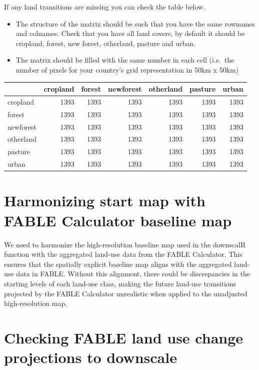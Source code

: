 \documentclass[
]{article}
\begin{document}
If any land transitions are missing you can check the table below.

\begin{itemize}
\item
  The structure of the matrix should be such that you have the same
  rownames and colnames. Check that you have all land covers, by default
  it should be cropland, forest, new forest, otherland, pasture and
  urban.
\item
  The matrix should be filled with the same number in each cell
  (i.e.~the number of pixels for your country's grid representation in
  50km x 50km)
\end{itemize}

\begin{longtable}[]{@{}lrrrrrr@{}}
\toprule\noalign{}
& cropland & forest & newforest & otherland & pasture & urban \\
\midrule\noalign{}
\endhead
\bottomrule\noalign{}
\endlastfoot
cropland & 1393 & 1393 & 1393 & 1393 & 1393 & 1393 \\
forest & 1393 & 1393 & 1393 & 1393 & 1393 & 1393 \\
newforest & 1393 & 1393 & 1393 & 1393 & 1393 & 1393 \\
otherland & 1393 & 1393 & 1393 & 1393 & 1393 & 1393 \\
pasture & 1393 & 1393 & 1393 & 1393 & 1393 & 1393 \\
urban & 1393 & 1393 & 1393 & 1393 & 1393 & 1393 \\
\end{longtable}

\section{Harmonizing start map with FABLE Calculator baseline
map}\label{harmonizing-start-map-with-fable-calculator-baseline-map}

We need to harmonize the high-resolution baseline map used in the
downscalR function with the aggregated land-use data from the FABLE
Calculator. This ensures that the spatially explicit baseline map aligns
with the aggregated land-use data in FABLE. Without this alignment,
there could be discrepancies in the starting levels of each land-use
class, making the future land-use transitions projected by the FABLE
Calculator unrealistic when applied to the unadjusted high-resolution
map.

\section{Checking FABLE land use change projections to
downscale}\label{checking-fable-land-use-change-projections-to-downscale}
\end{document}
